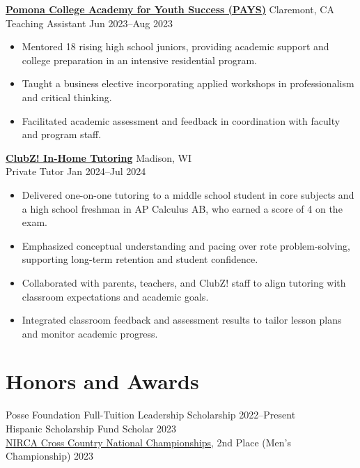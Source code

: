 \documentclass[10.5pt]{article} %
\begin{document}
\textbf{\href{https://www.pomona.edu/administration/draper-center/pays}{Pomona College Academy for Youth Success (PAYS)}} \hfill Claremont, CA \\
Teaching Assistant \hfill Jun 2023--Aug 2023
\begin{itemize}
    \item Mentored 18 rising high school juniors, providing academic support and college preparation in an intensive residential program.
    \item Taught a business elective incorporating applied workshops in professionalism and critical thinking.
    \item Facilitated academic assessment and feedback in coordination with faculty and program staff.
\end{itemize}

\vspace{2pt} %
\noindent\textbf{\href{https://clubztutoring.com/madison-wi/}{ClubZ! In-Home Tutoring}} \hfill Madison, WI \\
Private Tutor \hfill Jan 2024--Jul 2024
\begin{itemize}
    \item Delivered one-on-one tutoring to a middle school student in core subjects and a high school freshman in AP Calculus AB, who earned a score of 4 on the exam.
    \item Emphasized conceptual understanding and pacing over rote problem-solving, supporting long-term retention and student confidence.
    \item Collaborated with parents, teachers, and ClubZ! staff to align tutoring with classroom expectations and academic goals.
    \item Integrated classroom feedback and assessment results to tailor lesson plans and monitor academic progress.
\end{itemize}

\section*{Honors and Awards}

Posse Foundation Full-Tuition Leadership Scholarship \hfill 2022--Present \\
Hispanic Scholarship Fund Scholar \hfill 2023 \\
\href{https://www.nationalrunningclubdatabase.com/athletes/379/}{NIRCA Cross Country National Championships}, 2nd Place (Men’s Championship) \hfill 2023
\end{document}
